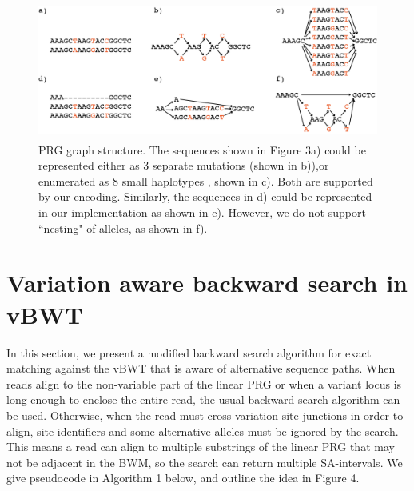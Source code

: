 \documentclass[runningheads,a4paper]{llncs}
\begin{document}
\begin{figure}
\centering
\includegraphics[height=4.5cm]{graph_construction.png}
\caption{PRG graph structure. The sequences shown in Figure 3a) could be represented either as 3 separate mutations (shown in b)),or enumerated as 8 small haplotypes , shown in c). Both are supported by our encoding. Similarly, the sequences in d) could be represented in our implementation as shown in e). However, we do not support ``nesting" of alleles, as shown in f).}
\label{lab}
\end{figure}






\section{Variation aware backward search in vBWT}

In this section, we present a modified backward search algorithm for exact matching against the vBWT that is aware of alternative sequence paths. When reads align to the non-variable part of the linear PRG or when a variant locus is long enough to enclose the entire read, the usual backward search algorithm can be used. Otherwise, when the read must cross variation site junctions in order to align, site identifiers and some alternative alleles must be ignored by the search. This means a read can align to multiple substrings of the linear PRG that may not be adjacent in the BWM, so the search can return multiple SA-intervals. We give pseudocode in Algorithm 1 below, and outline the idea in Figure 4.
\end{document}
